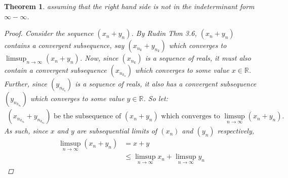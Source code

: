 \documentclass{amsart}
\newtheorem{theorem}{Theorem}
\begin{document}
\begin{enumerate}[1.]
\begin{theorem}
    assuming that the right hand side is not in the indeterminant form $\infty-\infty$.
    \begin{proof}
        Consider the sequence $(x_n + y_n)$. By Rudin Thm 3.6, $(x_n + y_n)$ contains a
        convergent subsequence, say $(x_{n_k} + y_{n_k})$ which converges to $\limsup_{n \to \infty} (x_n+y_n)$.
        Now, since $(x_{n_k})$ is a sequence of reals, it must also contain a convergent subsequence $(x_{n_{k_a}})$ which converges to some value $x\in\mathbb{R}$.
        Further, since $(y_{n_{k_a}})$ is a sequence of reals, it also has a convergent subsequence $(y_{n_{k_{a_b}}})$ which converges to some value $y \in \mathbb{R}$.
        So let:
        \begin{align*}
            (x_{n_{k_{a_b}}} + y_{n_{k_{a_b}}}) \text{ be the subsequence of } (x_{n} + y_{n}) \text{ which converges to } \limsup_{n \to \infty} (x_n+y_n).
        \end{align*}
        As such, since $x$ and $y$ are subsequential limits of $(x_n)$ and $(y_n)$ respectively,
        \begin{align*}
            \limsup_{n \to \infty} (x_n+y_n) &= x + y \\
            &\leq \limsup_{n \to \infty} x_n + \limsup_{n \to \infty} y_n
        \end{align*}


\end{proof}
\end{theorem}
\end{enumerate}
\end{document}
